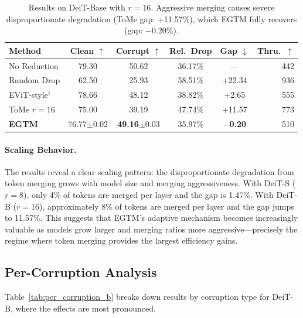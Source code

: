 \documentclass{article}
\newcommand{\ours}{EGTM}
\begin{document}
\begin{table}[t]
\caption{Results on DeiT-Base with $r{=}16$. Aggressive merging causes severe disproportionate degradation (ToMe gap: +11.57\%), which \ours{} fully recovers (gap: $-0.20\%$).}
\label{tab:main_deit_b}
\centering
\small
\begin{tabular}{lccccr}
\toprule
Method & Clean $\uparrow$ & Corrupt $\uparrow$ & Rel.\ Drop & Gap $\downarrow$ & Thru.\ $\uparrow$ \\
\midrule
No Reduction    & 79.30 & 50.62 & 36.17\% & ---    & 442 \\
Random Drop     & 62.50 & 25.93 & 58.51\% & +22.34 & 936 \\
EViT-style$^\dag$      & 78.66 & 48.12 & 38.82\% & +2.65  & 555 \\
ToMe $r{=}16$  & 75.00 & 39.19 & 47.74\% & +11.57 & 773 \\
\textbf{\ours{}} & 76.77{\scriptsize$\pm$0.02} & \textbf{49.16}{\scriptsize$\pm$0.03} & 35.97\% & \textbf{$-$0.20} & 510 \\
\bottomrule
\end{tabular}
\end{table}

\paragraph{Scaling Behavior.}
The results reveal a clear scaling pattern: the disproportionate degradation from token merging grows with model size and merging aggressiveness. With DeiT-S ($r{=}8$), only 4\% of tokens are merged per layer and the gap is 1.47\%. With DeiT-B ($r{=}16$), approximately 8\% of tokens are merged per layer and the gap jumps to 11.57\%. This suggests that \ours{}'s adaptive mechanism becomes increasingly valuable as models grow larger and merging ratios more aggressive---precisely the regime where token merging provides the largest efficiency gains.

\subsection{Per-Corruption Analysis}

Table~\ref{tab:per_corruption_b} breaks down results by corruption type for DeiT-B, where the effects are most pronounced.
\end{document}
